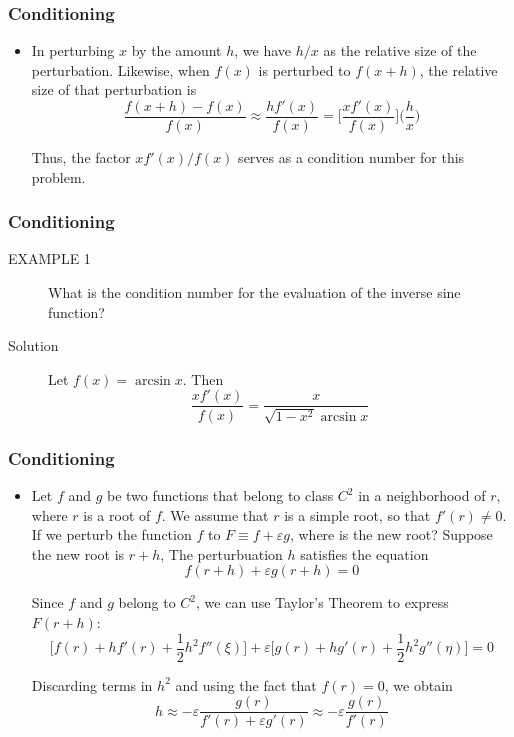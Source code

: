 \documentclass[notheorems,mathserif,table,compress]{beamer}  %
\begin{document}
\begin{frame}
\frametitle{Conditioning}
\begin{itemize}
\item  In perturbing $x$ by the amount $h$, we have $h/x$ as the relative size of the perturbation. Likewise, when $f(x)$ is perturbed to $f(x+h)$, the relative size of that perturbation is 
\begin{displaymath}
\frac{f(x+h)-f(x)}{f(x)}\approx\frac{hf'(x)}{f(x)}=\bigg[\frac{xf'(x)}{f(x)}\bigg]\bigg(\frac{h}{x}\bigg) 
\end{displaymath}

Thus, the factor $xf'(x)/f(x)$ serves as a condition number for this problem.
\end{itemize}
\end{frame}

\begin{frame}
\frametitle{Conditioning}
\begin{description}
\item[EXAMPLE 1] What is the condition number for the evaluation of the inverse sine function?
\item[Solution] Let $f(x)=\arcsin x$. Then
\begin{displaymath}
\frac{xf'(x)}{f(x)}=\frac{x}{\sqrt{1-x^2}\arcsin x}
\end{displaymath}

\end{description}
\end{frame}

\begin{frame}
\frametitle{Conditioning}
\begin{itemize}
\item Let $f$ and $g$ be two functions that belong to class $C^2$ in a neighborhood of $r$, where $r$ is a root of $f$. We assume that $r$ is a simple root, so that $f'(r)\neq0$. If we perturb the function $f$ to $F\equiv f+\varepsilon g$, where is the new root? Suppose the new root is $r+h$, The perturbuation $h$ satisfies the equation
\begin{displaymath}
f(r+h)+\varepsilon g(r+h)=0
\end{displaymath}

Since $f$ and $g$ belong to $C^2$, we can use Taylor's Theorem to express $F(r+h)$:
\begin{displaymath}
\Big[f(r)+hf'(r)+\frac{1}{2}h^2 f''(\xi)\Big]+\varepsilon\Big[g(r)+hg'(r)+\frac{1}{2}h^2g''(\eta)\Big]=0
\end{displaymath}

Discarding terms in $h^2$ and using the fact that $f(r)=0$, we obtain
\begin{displaymath}
h\approx-\varepsilon \frac{g(r)}{f'(r)+\varepsilon g'(r)}\approx-\varepsilon \frac{g(r)}{f'(r)}
\end{displaymath}

\end{itemize}
\end{frame}
\end{document}
